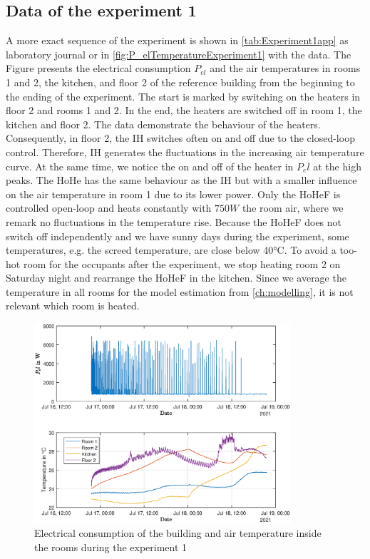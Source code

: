 \subsection{Data of the experiment 1}
\label{subsec:Data of the experiment 1}
A more exact sequence of the experiment is shown in \autoref{tab:Experiment1app} as laboratory journal or in \autoref{fig:P_elTemperatureExperiment1} with the data. The Figure presents the electrical consumption $P_{el}$ and the air temperatures in rooms 1 and 2, the kitchen, and floor 2 of the reference building from the beginning to the ending of the experiment. The start is marked by switching on the heaters in floor 2 and rooms 1 and 2. In the end, the heaters are switched off in room 1, the kitchen and floor 2. \newline 
The data demonstrate the behaviour of the heaters. Consequently, in floor 2, the IH switches often on and off due to the closed-loop control. Therefore, IH generates the fluctuations in the increasing air temperature curve. At the same time, we notice the on and off of the heater in $P_el$ at the high peaks. The HoHe has the same behaviour as the IH but with a smaller influence on the air temperature in room 1 due to its lower power. \newline
Only the HoHeF is controlled open-loop and heats constantly with $750 W$ the room air, where we remark no fluctuations in the temperature rise. Because the HoHeF does not switch off independently and we have sunny days during the experiment, some temperatures, e.g. the screed temperature, are close below 40°C. To avoid a too-hot room for the occupants after the experiment, we stop heating room 2 on Saturday night and rearrange the HoHeF in the kitchen. Since we average the temperature in all rooms for the model estimation from \autoref{ch:modelling}, it is not relevant which room is heated.
\begin{figure}
            \centering
            \includegraphics[width=0.85\textwidth]{figure/P_el_trainingsdaten_latex.eps}
           \caption{Electrical consumption of the building and air temperature inside the rooms during the experiment 1}
           \label{fig:P_elTemperatureExperiment1}
    \end{figure}
